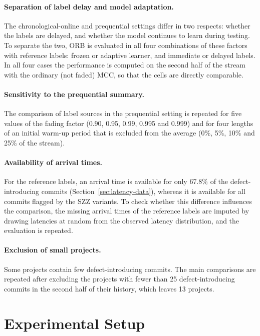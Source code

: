 \documentclass[12pt,a4paper,oneside]{report}
\begin{document}
\paragraph{Separation of label delay and model adaptation.} The
chronological-online and prequential settings differ in two respects: whether
the labels are delayed, and whether the model continues to learn during
testing. To separate the two, ORB is evaluated in all four combinations of
these factors with reference labels: frozen or adaptive learner, and
immediate or delayed labels. In all four cases the performance is computed on
the second half of the stream with the ordinary (not faded) MCC, so that the
cells are directly comparable.

\paragraph{Sensitivity to the prequential summary.} The comparison of label
sources in the prequential setting is repeated for five values of the fading
factor (0.90, 0.95, 0.99, 0.995 and 0.999) and for four lengths of an initial
warm-up period that is excluded from the average (0\%, 5\%, 10\% and 25\% of
the stream).

\paragraph{Availability of arrival times.} For the reference labels, an
arrival time is available for only 67.8\% of the defect-introducing commits
(Section~\ref{sec:latency-data}), whereas it is available for all commits
flagged by the SZZ variants. To check whether this difference influences the
comparison, the missing arrival times of the reference labels are imputed by
drawing latencies at random from the observed latency distribution, and the
evaluation is repeated.

\paragraph{Exclusion of small projects.} Some projects contain few
defect-introducing commits. The main comparisons are repeated after
excluding the projects with fewer than 25 defect-introducing commits in the
second half of their history, which leaves 13 projects.

\section{Experimental Setup}
\end{document}
